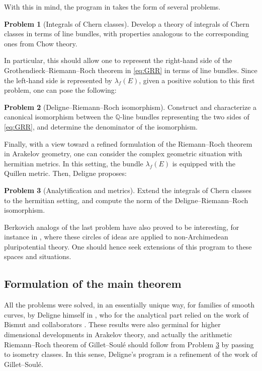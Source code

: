 \documentclass[11pt]{article}
\theoremstyle{plain}
\theoremstyle{definition}
\newtheorem{problem-Deligne}{Problem}
\newcommand{\QBbb}{\mathbb Q}
\begin{document}
With this in mind, the program in \cite{Deligne-determinant} takes the form of several problems.

\begin{problem-Deligne} [Integrals of Chern classes]\label{problem1}
Develop a theory of integrals of Chern classes in terms of line bundles, with properties analogous to the corresponding ones from Chow theory.
\end{problem-Deligne}

In particular, this should allow one to represent the right-hand side of the Grothendieck--Riemann--Roch theorem in \eqref{eq:GRR} in terms of line bundles. Since the left-hand side is represented by $\lambda_f(E)$, given a positive solution to this first problem, one can pose the following:

\begin{problem-Deligne} [Deligne--Riemann--Roch isomorphism]\label{problem2}
Construct and characterize a canonical isomorphism between the $\QBbb$-line bundles representing the two sides of \eqref{eq:GRR}, and determine the denominator of the isomorphism.
\end{problem-Deligne}

Finally, with a view toward a refined formulation of the Riemann--Roch theorem in Arakelov geometry, one can consider the complex geometric situation with hermitian metrics. In this setting, the bundle $\lambda_f(E)$ is equipped with the Quillen metric. Then, Deligne proposes:

\begin{problem-Deligne}[Analytification and metrics]\label{problem3}
Extend the integrals of Chern classes to the hermitian setting, and compute the norm of the Deligne--Riemann--Roch isomorphism.
\end{problem-Deligne}

Berkovich analogs of the last problem have also proved to be interesting, for instance in \cite{Boucksom-Eriksson, SebWalMarDiff}, where these circles of ideas are applied to non-Archimedean pluripotential theory. One should hence seek extensions of this program to these spaces and situations.\enlargethispage{\baselineskip}%

\subsection{Formulation of the main theorem} All the problems were solved, in an essen\-tially unique way, for families of smooth curves, by Deligne himself in \cite{Deligne-determinant}, who for the analytical part relied on the work of Bismut and collaborators \cite{freed1, freed2, BGS1, BGS2, BGS3}. These results were also germinal for higher dimensional developments in Arakelov theory, and actually the arithmetic Riemann--Roch theorem of Gillet--Soulé \cite{GS-ARR} should follow from Problem \ref{problem3} by passing to isometry classes. In this sense, Deligne's program is a refinement of the work of Gillet--Soulé.
\end{document}
